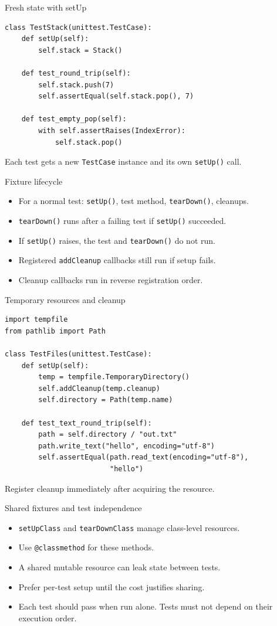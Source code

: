 \documentclass[aspectratio=169,11pt]{beamer}
\newcommand{\code}[1]{\texttt{#1}}
\begin{document}
\begin{frame}[fragile]{Fresh state with setUp}
\begin{lstlisting}
class TestStack(unittest.TestCase):
    def setUp(self):
        self.stack = Stack()

    def test_round_trip(self):
        self.stack.push(7)
        self.assertEqual(self.stack.pop(), 7)

    def test_empty_pop(self):
        with self.assertRaises(IndexError):
            self.stack.pop()
\end{lstlisting}
Each test gets a new \code{TestCase} instance and its own \code{setUp()} call.
\end{frame}

\begin{frame}[fragile]{Fixture lifecycle}
\begin{itemize}
\item For a normal test: \code{setUp()}, test method, \code{tearDown()}, cleanups.
\item \code{tearDown()} runs after a failing test if \code{setUp()} succeeded.
\item If \code{setUp()} raises, the test and \code{tearDown()} do not run.
\item Registered \code{addCleanup} callbacks still run if setup fails.
\item Cleanup callbacks run in reverse registration order.
\end{itemize}
\end{frame}

\begin{frame}[fragile]{Temporary resources and cleanup}
\begin{lstlisting}
import tempfile
from pathlib import Path

class TestFiles(unittest.TestCase):
    def setUp(self):
        temp = tempfile.TemporaryDirectory()
        self.addCleanup(temp.cleanup)
        self.directory = Path(temp.name)

    def test_text_round_trip(self):
        path = self.directory / "out.txt"
        path.write_text("hello", encoding="utf-8")
        self.assertEqual(path.read_text(encoding="utf-8"),
                         "hello")
\end{lstlisting}
Register cleanup immediately after acquiring the resource.
\end{frame}

\begin{frame}[fragile]{Shared fixtures and test independence}
\begin{itemize}
\item \code{setUpClass} and \code{tearDownClass} manage class-level resources.
\item Use \code{@classmethod} for these methods.
\item A shared mutable resource can leak state between tests.
\item Prefer per-test setup until the cost justifies sharing.
\item Each test should pass when run alone. Tests must not depend on their execution order.
\end{itemize}
\end{frame}
\end{document}

